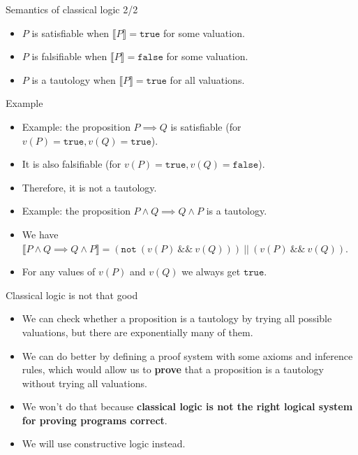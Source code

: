\documentclass{beamer}
\newcommand{\m}[1]{\texttt{#1}}
\newcommand{\true}{\m{true}}
\newcommand{\false}{\m{false}}
\newcommand{\mnotb}[1]{\m{not}\ #1}
\newcommand{\mandb}[2]{#1\ \m{\&\&}\ #2}
\newcommand{\morb}[2]{#1\ \m{||}\ #2}
\newcommand{\sem}[1]{\llbracket #1 \rrbracket}
\begin{document}
\begin{frame}{Semantics of classical logic 2/2}
\begin{itemize}
	\item $P$ is satisfiable when $\sem{P} = \true$ for some valuation.
	\item $P$ is falsifiable when $\sem{P} = \false$ for some valuation.
	\item $P$ is a tautology when $\sem{P} = \true$ for all valuations.
\end{itemize}
\end{frame}

\begin{frame}{Example}
\begin{itemize}
	\item Example: the proposition $P \implies Q$ is satisfiable (for $v(P) = \true, v(Q) = \true$).
	\item It is also falsifiable (for $v(P) = \true, v(Q) = \false$).
	\item Therefore, it is not a tautology.
	\item Example: the proposition $P \land Q \implies Q \land P$ is a tautology.
	\item We have $\sem{P \land Q \implies Q \land P} = \morb{(\mnotb{(\mandb{v(P)}{v(Q)})})}{(\mandb{v(P)}{v(Q)})}$.
	\item For any values of $v(P)$ and $v(Q)$ we always get $\true$.
\end{itemize}
\end{frame}

\begin{frame}{Classical logic is not that good}
\begin{itemize}
	\item We can check whether a proposition is a tautology by trying all possible valuations, but there are exponentially many of them.
	\item We can do better by defining a proof system with some axioms and inference rules, which would allow us to \textbf{prove} that a proposition is a tautology without trying all valuations.
	\item We won't do that because \textbf{classical logic is not the right logical system for proving programs correct}.
	\item We will use constructive logic instead.
\end{itemize}
\end{frame}
\end{document}

